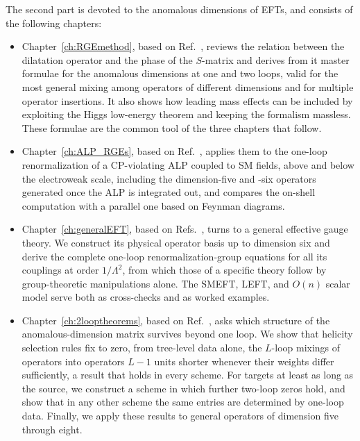 The second part is devoted to the anomalous dimensions of EFTs, and consists of the following
chapters:
\begin{itemize}
    \item Chapter~\ref{ch:RGEmethod}, based on Ref.~\cite{Bresciani:2023jsu}, reviews the relation between the dilatation operator and the phase of the $S$-matrix and derives from it master
    formulae for the anomalous dimensions at one and two loops, valid for the most general mixing
    among operators of different dimensions and for multiple operator insertions. It also shows how
    leading mass effects can be included by exploiting the Higgs low-energy theorem and keeping the formalism massless. These formulae are the common tool of the three chapters that follow.
    \item Chapter~\ref{ch:ALP_RGEs}, based on Ref.~\cite{Bresciani:2024shu}, applies them to the
    one-loop renormalization of a CP-violating ALP coupled to SM fields, above and below
    the electroweak scale, including the dimension-five and -six operators generated once the ALP is
    integrated out, and compares the on-shell computation with a parallel one based on Feynman
    diagrams.
    \item Chapter~\ref{ch:generalEFT}, based on Refs.~\cite{Aebischer:2025zxg,Aebischer:2025ddl},
    turns to a general effective gauge theory. We construct its physical operator basis up to
    dimension six and derive the complete one-loop renormalization-group equations for all its
    couplings at order $1/\Lambda^2$, from which those of a specific theory follow by group-theoretic
    manipulations alone. The SMEFT, LEFT, and $O(n)$ scalar model serve both as cross-checks and as worked examples.
    \item Chapter~\ref{ch:2looptheorems}, based on Ref.~\cite{Bresciani:2026yuw}, asks which
    structure of the anomalous-dimension matrix survives beyond one loop. We show that helicity
    selection rules fix to zero, from tree-level data alone, the $L$-loop mixings of operators into
    operators $L-1$ units shorter whenever their weights differ sufficiently, a result that holds in
    every scheme. For targets at least as long as the source,
    we construct a scheme in which further two-loop zeros hold, and show that in any other scheme the
    same entries are determined by one-loop data. Finally, we apply these results to general operators of
    dimension five through eight.
\end{itemize}

